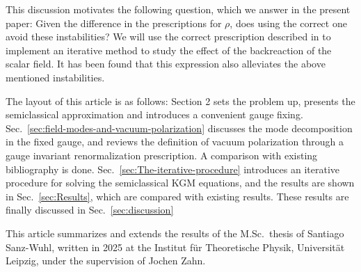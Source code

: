 This discussion motivates the following question, which we answer in the present paper: Given the difference in the prescriptions for $\rho$, does using the correct one avoid these instabilities? We will use the correct prescription described in \cite{wernersson_vacuum_2021} to implement an iterative method to study the effect of the backreaction of the scalar field. It has been found that this expression also alleviates the above mentioned instabilities.  

The layout of this article is as follows: Section 2 sets the problem up, presents the semiclassical approximation and introduces a convenient gauge fixing. Sec.~\ref{sec:field-modes-and-vacuum-polarization} discusses the mode decomposition in the fixed gauge, and reviews the definition of vacuum polarization through a gauge invariant renormalization prescription. A comparison with existing bibliography is done. Sec.~\ref{sec:The-iterative-procedure} introduces an iterative procedure for solving the semiclassical KGM equations, and the results are shown in Sec.~\ref{sec:Results}, which are compared with existing results. These results are finally discussed in Sec.~\ref{sec:discussion}

This article summarizes and extends the results of the M.Sc.~thesis of Santiago Sanz-Wuhl, written in 2025 at the Institut für Theoretische Physik, Universität Leipzig, under the supervision of Jochen Zahn. 